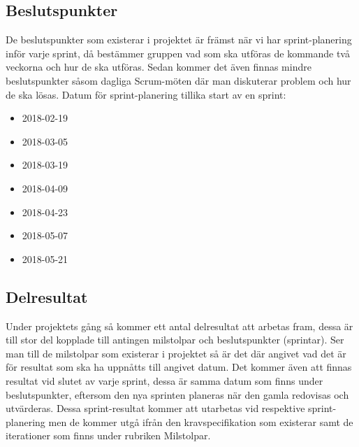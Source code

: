 \documentclass[a4paper,10pt, twoside]{article}
\begin{document}
\subsection{Beslutspunkter}
De beslutspunkter som existerar i projektet är främst när vi har sprint-planering inför varje sprint, då bestämmer gruppen vad som ska utföras de kommande två veckorna och hur de ska utföras. Sedan kommer det även finnas mindre beslutspunkter såsom dagliga Scrum-möten där man diskuterar problem och hur de ska lösas.
Datum för sprint-planering tillika start av en sprint:
\begin{itemize}
\item 2018-02-19
\item 2018-03-05
\item 2018-03-19
\item 2018-04-09
\item 2018-04-23
\item 2018-05-07
\item 2018-05-21
\end{itemize}
\subsection{Delresultat}
Under projektets gång så kommer ett antal delresultat att arbetas fram, dessa är till stor del kopplade till antingen milstolpar och beslutspunkter (sprintar). Ser man till de milstolpar som existerar i projektet så är det där angivet vad det är för resultat som ska ha uppnåtts till angivet datum. Det kommer även att finnas resultat vid slutet av varje sprint, dessa är samma datum som finns under beslutspunkter, eftersom den nya sprinten planeras när den gamla redovisas och utvärderas. Dessa sprint-resultat kommer att utarbetas vid respektive sprint-planering men de kommer utgå ifrån den kravspecifikation som existerar samt de iterationer som finns under rubriken Milstolpar.
\end{document}
